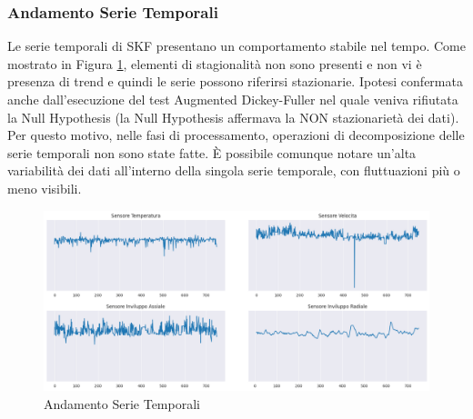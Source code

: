 \subsubsection{Andamento Serie Temporali}
Le serie temporali di SKF presentano un comportamento stabile nel tempo. Come mostrato in Figura \ref{sensors_plot}, elementi di stagionalità non sono presenti e non vi è presenza di trend e quindi le serie possono riferirsi stazionarie. Ipotesi confermata anche dall'esecuzione del test Augmented Dickey-Fuller nel quale veniva rifiutata la Null Hypothesis (la Null Hypothesis affermava la NON stazionarietà dei dati).
Per questo motivo, nelle fasi di processamento, operazioni di decomposizione delle serie temporali non sono state fatte.
È possibile comunque notare un'alta variabilità dei dati all'interno della singola serie temporale, con fluttuazioni più o meno visibili.
\begin{figure}[t]
	\centering
	\includegraphics[width=14cm, scale=1]{images/sensors_plot}
	\caption{Andamento Serie Temporali}
	\label{sensors_plot}
		
\end{figure}

